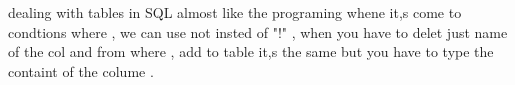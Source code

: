  dealing with  tables in SQL almost like the programing whene it,s come to condtions
 where  , we can use not insted of "!" , when you have to delet just name of the col and from
  where , add to table it,s the same but you have to type the containt of the colume .
